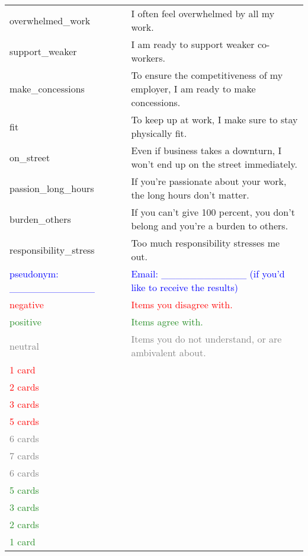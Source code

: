 \documentclass[a4paper,12pt]{article}\usepackage[]{graphicx}\usepackage[]{color}
\begin{document}
\begin{longtable}{H{72mm}m{0mm}m{75mm}}
  overwhelmed{\_{}}work & \rule[-27mm]{0mm}{54mm} & I often feel overwhelmed by all my work. \\
  support{\_{}}weaker & \rule[-27mm]{0mm}{54mm} & I am ready to support weaker co-workers. \\
  make{\_{}}concessions & \rule[-27mm]{0mm}{54mm} & To ensure the competitiveness of my employer, I am ready to make concessions. \\
  fit & \rule[-27mm]{0mm}{54mm} & To keep up at work, I make sure to stay physically fit. \\
  on{\_{}}street & \rule[-27mm]{0mm}{54mm} & Even if business takes a downturn, I won’t end up on the street immediately. \\
  passion{\_{}}long{\_{}}hours & \rule[-27mm]{0mm}{54mm} & If you’re passionate about your work, the long hours don’t matter. \\
  burden{\_{}}others & \rule[-27mm]{0mm}{54mm} & If you can’t give 100 percent, you don’t belong and you’re a burden to others. \\
  responsibility{\_{}}stress & \rule[-27mm]{0mm}{54mm} & Too much responsibility stresses me out. \\

  \textcolor{blue}{pseudonym: \_\_\_\_\_\_\_\_\_\_\_\_} & \rule[-27mm]{0mm}{54mm} & \textcolor{blue}{Email: \_\_\_\_\_\_\_\_\_\_\_\_ (if you'd like to receive the results)}\\

  \textcolor{red}{negative} & \rule[-27mm]{0mm}{54mm} & \textcolor{red}{Items you disagree with.} \\
  \textcolor{ForestGreen}{positive} & \rule[-27mm]{0mm}{54mm} & \textcolor{ForestGreen}{Items agree with.} \\
  \textcolor{Gray}{neutral} & \rule[-27mm]{0mm}{54mm} & \textcolor{Gray}{Items you do not understand, or are ambivalent about.} \\

  \textcolor{red}{1 card} & \rule[-27mm]{0mm}{54mm} & \\ %
  \textcolor{red}{2 cards} & \rule[-27mm]{0mm}{54mm} & \\ %
  \textcolor{red}{3 cards} & \rule[-27mm]{0mm}{54mm} & \\ %
  \textcolor{red}{5 cards} & \rule[-27mm]{0mm}{54mm} & \\ %
  \textcolor{Gray}{6 cards} & \rule[-27mm]{0mm}{54mm} & \\ %
  \textcolor{Gray}{7 cards} & \rule[-27mm]{0mm}{54mm} & \\ %
  \textcolor{Gray}{6 cards} & \rule[-27mm]{0mm}{54mm} & \\ %
  \textcolor{ForestGreen}{5 cards} & \rule[-27mm]{0mm}{54mm} & \\ %
  \textcolor{ForestGreen}{3 cards} & \rule[-27mm]{0mm}{54mm} & \\ %
  \textcolor{ForestGreen}{2 cards} & \rule[-27mm]{0mm}{54mm} & \\ %
  \textcolor{ForestGreen}{1 card} & \rule[-27mm]{0mm}{54mm} & \\ %


\end{longtable}
\end{document}
